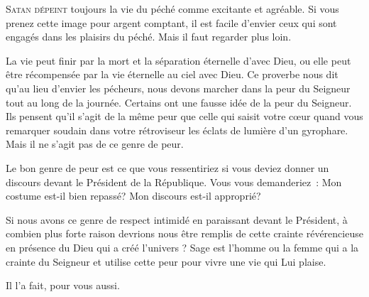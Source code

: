 



\lettrine{S}{atan dépeint} toujours la vie du péché
 comme excitante et agréable.
 Si vous prenez cette image pour argent comptant,
 il est facile d'envier ceux qui sont engagés
 dans les plaisirs du péché. Mais il faut regarder plus loin. 


La vie peut finir par la mort et la séparation éternelle d'avec Dieu,
 ou elle peut être récompensée par la vie éternelle au ciel avec Dieu.
 Ce proverbe nous dit qu'au lieu d'envier les pécheurs,
 nous devons marcher dans la peur 
 du Seigneur tout au long de la journée.
 Certains ont une fausse idée de la peur du Seigneur.
 Ils pensent qu'il s'agit de la même peur que celle qui saisit votre cœur
 quand vous remarquer soudain dans votre rétroviseur les éclats de lumière
 d'un gyrophare. Mais il ne s'agit pas de ce genre de peur. 

Le bon genre de peur est ce que vous ressentiriez si vous deviez donner
 un discours devant le Président de la République.
 Vous vous demanderiez~: 
 \og Mon costume est-il bien repassé? 
 Mon discours est-il approprié? \fg{}

Si nous avons ce genre de respect intimidé en paraissant devant le Président,
 à combien plus forte raison devrions nous être remplis de cette crainte
 révérencieuse en présence du Dieu qui a créé l'univers ?
 Sage est l'homme ou la femme qui a la crainte du Seigneur
 \ocadr et utilise cette peur pour vivre une vie qui Lui plaise. 

Il l'a fait, pour vous aussi.

\dvrule






